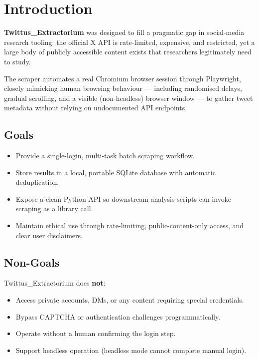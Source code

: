 \documentclass[11pt, a4paper]{article}
\newenvironment{warnbox}[1][Warning]{%
  \begin{tcolorbox}[enhanced, breakable,
    colback=TwRed!6, colframe=TwRed,
    boxrule=0.8pt, arc=5pt,
    left=8pt, right=8pt, top=5pt, bottom=5pt,
    title={\textbf{#1}},
    fonttitle=\small\color{TwRed},
    attach boxed title to top left={yshift=-2mm, xshift=8mm},
    boxed title style={colback=TwRed!6, colframe=TwRed, arc=3pt}]
}{\end{tcolorbox}}
\def\color#1{}%
\begin{document}
\newpage

\tableofcontents

\newpage

\section{Introduction}

\textbf{Twittus\_Extractorium} was designed to fill a pragmatic gap in social-media
research tooling: the official X API is rate-limited, expensive, and restricted,
yet a large body of publicly accessible content exists that researchers legitimately
need to study.

The scraper automates a real Chromium browser session through Playwright, closely
mimicking human browsing behaviour --- including randomised delays, gradual scrolling,
and a visible (non-headless) browser window --- to gather tweet metadata without
relying on undocumented API endpoints.

\subsection{Goals}

\begin{itemize}[leftmargin=1.6em, itemsep=3pt]
  \item Provide a single-login, multi-task batch scraping workflow.
  \item Store results in a local, portable SQLite database with automatic deduplication.
  \item Expose a clean Python API so downstream analysis scripts can invoke scraping as a library call.
  \item Maintain ethical use through rate-limiting, public-content-only access, and clear user disclaimers.
\end{itemize}

\subsection{Non-Goals}

\begin{warnbox}[Scope Limitations]
Twittus\_Extractorium does \textbf{not}:
\begin{itemize}[leftmargin=1.2em, itemsep=2pt]
  \item Access private accounts, DMs, or any content requiring special credentials.
  \item Bypass CAPTCHA or authentication challenges programmatically.
  \item Operate without a human confirming the login step.
  \item Support headless operation (headless mode cannot complete manual login).
\end{itemize}
\end{warnbox}
\end{document}

